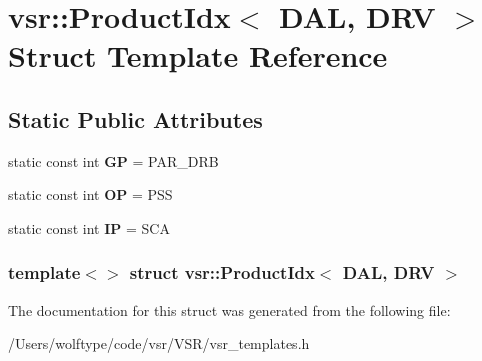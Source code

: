 \hypertarget{structvsr_1_1_product_idx_3_01_d_a_l_00_01_d_r_v_01_4}{\section{vsr\-:\-:Product\-Idx$<$ D\-A\-L, D\-R\-V $>$ Struct Template Reference}
\label{structvsr_1_1_product_idx_3_01_d_a_l_00_01_d_r_v_01_4}
}
\subsection*{Static Public Attributes}
\begin{DoxyCompactItemize}
\item 
\hypertarget{structvsr_1_1_product_idx_3_01_d_a_l_00_01_d_r_v_01_4_a46b7804051b203aad3cf4d806a3ab5b5}{static const int {\bfseries G\-P} = P\-A\-R\-\_\-\-D\-R\-B}\label{structvsr_1_1_product_idx_3_01_d_a_l_00_01_d_r_v_01_4_a46b7804051b203aad3cf4d806a3ab5b5}

\item 
\hypertarget{structvsr_1_1_product_idx_3_01_d_a_l_00_01_d_r_v_01_4_a7f5368cd9c2906706fc9cf65a2174bf9}{static const int {\bfseries O\-P} = P\-S\-S}\label{structvsr_1_1_product_idx_3_01_d_a_l_00_01_d_r_v_01_4_a7f5368cd9c2906706fc9cf65a2174bf9}

\item 
\hypertarget{structvsr_1_1_product_idx_3_01_d_a_l_00_01_d_r_v_01_4_aa3eb19e711cc8dbd224dd6b76e96a56b}{static const int {\bfseries I\-P} = S\-C\-A}\label{structvsr_1_1_product_idx_3_01_d_a_l_00_01_d_r_v_01_4_aa3eb19e711cc8dbd224dd6b76e96a56b}

\end{DoxyCompactItemize}
\subsubsection*{template$<$$>$ struct vsr\-::\-Product\-Idx$<$ D\-A\-L, D\-R\-V $>$}



The documentation for this struct was generated from the following file\-:\begin{DoxyCompactItemize}
\item 
/\-Users/wolftype/code/vsr/\-V\-S\-R/vsr\-\_\-templates.\-h\end{DoxyCompactItemize}

